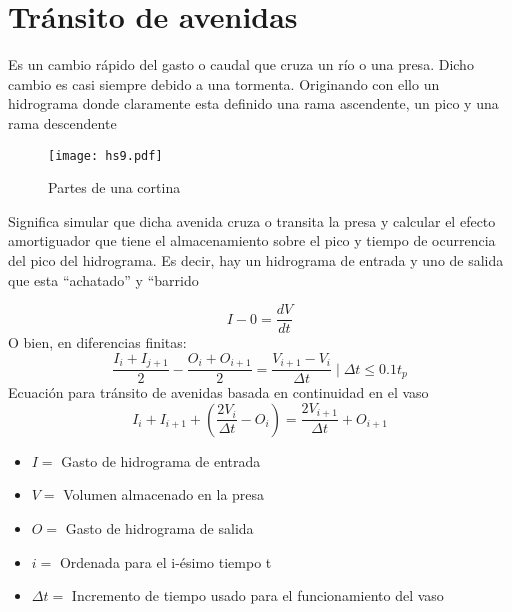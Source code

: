 \section{Tránsito de avenidas}
\begin{definition}
    Es un cambio rápido del gasto o caudal que cruza un río o una presa. Dicho cambio es casi siempre debido a una tormenta. Originando con ello un hidrograma donde claramente esta definido una rama ascendente, un pico y una rama descendente
\end{definition}
\begin{figure}[h!]
\centering
  \texttt{[image: hs9.pdf]}
  \caption{Partes de una cortina}
  \label{hs9}
\end{figure}
\begin{definition}
    Significa simular que dicha avenida cruza o transita la presa y calcular el efecto amortiguador que tiene el almacenamiento sobre el pico y tiempo de ocurrencia del pico del hidrograma. Es decir, hay un hidrograma de entrada y uno de salida que esta “achatado” y “barrido
\end{definition}
\begin{equation}
    I - 0 =\frac{dV}{dt}
\end{equation}
O bien, en diferencias finitas:
\begin{equation}
    \frac{I_i + I_{j + 1}}{2} -\frac{O_i + O_{i + 1}}{2} =\frac{V_{i+ 1} - V_i}{\Delta t}\mid \Delta t\leq 0.1t_p
\end{equation}
Ecuación para tránsito de avenidas basada en continuidad en el vaso
\begin{equation}
    \label{eqhs1}
    I_i + I_{i + 1} +\left(\frac{2V_i}{\Delta t} - O_i\right) =\frac{2V_{i + 1}}{\Delta t} + O_{i + 1}
\end{equation}
\begin{notation}
    \begin{itemize}
        \item $I=$ Gasto de hidrograma de entrada
        \item $V=$ Volumen almacenado en la presa
        \item $O=$ Gasto de hidrograma de salida
        \item $i=$ Ordenada para el i-ésimo tiempo t
        \item $\Delta t=$ Incremento de tiempo usado para el funcionamiento del vaso
    \end{itemize}
\end{notation}
